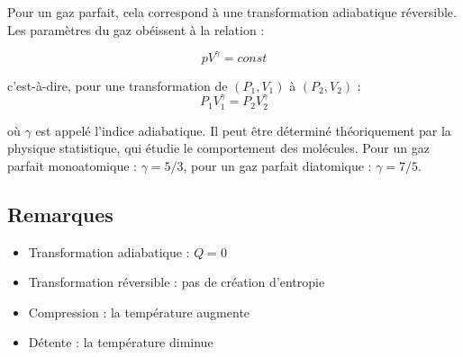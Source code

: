 \documentclass[11pt]{article}
\begin{document}
	Pour un gaz parfait, cela correspond à une transformation adiabatique réversible.  
	Les paramètres du gaz obéissent à la relation :
	
	\[
	p V^{\gamma} =   const 
	\]
	
	c’est-à-dire, pour une transformation de $(P_1, V_1)$ à $(P_2, V_2)$ :
	\[
	P_1 V_1^{\gamma} = P_2 V_2^{\gamma}
	\]
	
	où $\gamma$ est appelé l’indice adiabatique. Il peut être déterminé théoriquement par la physique statistique, qui étudie le comportement des molécules.  
	Pour un gaz parfait monoatomique : $\gamma = 5/3$,  
	pour un gaz parfait diatomique : $\gamma = 7/5$.
	
	\subsection*{Remarques}
	
	\begin{itemize}
		\item Transformation adiabatique : \( Q = 0 \)
		\item Transformation réversible : pas de création d'entropie
		\item Compression : la température augmente
		\item Détente : la température diminue
	\end{itemize}
 
	
\end{document}
